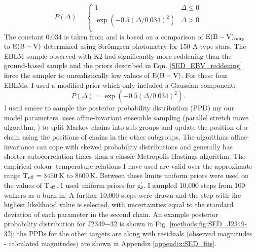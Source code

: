 \begin{equation}\label{SED_EBV_reddening}
P(\Delta) =  \left\{ \begin{array}{ll} 1 & \Delta \le 0 \\ \exp(-0.5(\Delta/0.034)^2) & \Delta > 0 \\ \end{array} 
\end{equation}
%
The constant 0.034 is taken from \citet{2014MNRAS.437.1681M} and is based on a comparison of ${\rm E}({\rm B}-{\rm V})_{\rm map}$ to ${\rm E}({\rm B}-{\rm V})$ determined using Str\"{o}mgren photometry for 150 A-type stars. The EBLM sample observed with K2 had significantly more reddening than the ground-based sample and the priors described in Eqn. \ref{SED_EBV_reddening} force the sampler to unrealistically low values of ${\rm E}({\rm B}-{\rm V})$. For these four EBLMs, I used a modified prior which only included a Gaussian component:
%
\begin{equation}\label{SED_EBV_reddening_moddified}
P(\Delta) =   \exp(-0.5(\Delta/0.034)^2). 
\end{equation}
%
I used {\sc emcee} \citep{2013PASP..125..306F} to sample the posterior probability distribution (PPD) my our model parameters. {} uses affine-invariant ensemble sampling (parallel stretch move algorithm; \citealt{Goodman2010}) to split Markov chains into sub-groups and update the position of a chain using the positions of chains in the other subgroups. The algorithms affine-invariance can cope with skewed probability distributions and generally has shorter autocorrelation times than a classic Metropolis-Hastings algorithm. The empirical colour--temperature relations I have used are valid over the approximate range T$_{\rm eff} = 3450$\,K to 8600\,K.  %
Between these limits uniform priors were used on the values of T$_{\rm eff}$. I used uniform priors for g$^{\prime}_{0}$. I sampled 10,000 steps from 100 walkers as a burn-in. A further 10,000 steps were drawn and the step with the highest likelihood value is selected,  with uncertainties equal to the standard deviation of each parameter in the second chain. An example posterior probability distribution for J2349$-$32 is shown in Fig. \ref{methods:fig:SED_J2349-32}; the  PPDs for the other targets are along with residuals (observed magnitudes - calculated magnitudes) are shown in Appendix \ref{appendix:SED_fits}.


